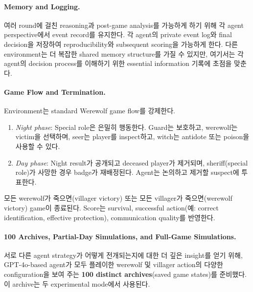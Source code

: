 \paragraph{Memory and Logging.}
여러 round에 걸친 reasoning과 post-game analysis를 가능하게 하기 위해 각 agent perspective에서 event record를 유지한다. 각 agent의 private event log와 final decision을 저장하여 reproducibility와 subsequent scoring을 가능하게 한다. 다른 environment는 더 복잡한 shared memory structure를 가질 수 있지만, 여기서는 각 agent의 decision process를 이해하기 위한 essential information 기록에 초점을 맞춘다.

\paragraph{Game Flow and Termination.}
Environment는 standard Werewolf game flow를 강제한다.
\begin{enumerate}
    \item \emph{Night phase}: Special role은 은밀히 행동한다. Guard는 보호하고, werewolf는 victim을 선택하며, seer는 player를 inspect하고, witch는 antidote 또는 poison을 사용할 수 있다.
    \item \emph{Day phase}: Night result가 공개되고 deceased player가 제거되며, sheriff(special role)가 사망한 경우 badge가 재배정된다. Agent는 논의하고 제거할 suspect에 투표한다.
\end{enumerate}
모든 werewolf가 죽으면(villager victory) 또는 모든 villager가 죽으면(werewolf victory) game이 종료된다. Score는 survival, successful action(예: correct identification, effective protection), communication quality를 반영한다.
\paragraph{100 Archives, Partial-Day Simulations, and Full-Game Simulations.}
서로 다른 agent strategy가 어떻게 전개되는지에 대한 더 깊은 insight를 얻기 위해, GPT-4o-based agent가 모두 플레이한 werewolf 및 villager action의 다양한 configuration을 보여 주는 \textbf{100 distinct archives}(saved game states)를 준비했다. 이 archive는 두 experimental mode에서 사용된다.

